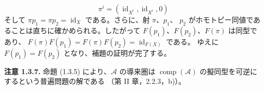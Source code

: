\begin{equation}
\pi^i=(\operatorname{id}_{X^i},\operatorname{id}_{X^i},0)
\tag{1.3.6.3}
\end{equation}
そして $\pi p_1=\pi p_2=\operatorname{id}_X$ である。さらに、射 $\pi$、$p_1$、
$p_2$ がホモトピー同値であることは直ちに確かめられる。したがって
$F(p_1)$、$F(p_2)$、$F(\pi)$ は同型であり、
$F(\pi)F(p_1)=F(\pi)F(p_2)=\operatorname{id}_{F(X)}$ である。
ゆえに $F(p_1)=F(p_2)$ となり、補題の証明が完了する。

\medskip\noindent\textbf{注意 1.3.7.}\quad
命題 (1.3.5) により、$\mathcal A$ の導来圏は
$\operatorname{comp}(\mathcal A)$ の擬同型を可逆にするという普遍問題の解である
（第 II 章，2.2.3，b)）。
\endgroup
